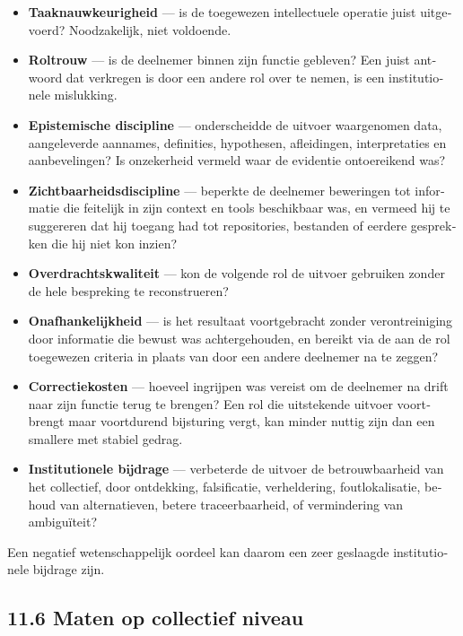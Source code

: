 \begin{dutch}
\begin{itemize}
  \item \textbf{Taaknauwkeurigheid} — is de toegewezen intellectuele operatie juist uitgevoerd? Noodzakelijk, niet voldoende.
  \item \textbf{Roltrouw} — is de deelnemer binnen zijn functie gebleven? Een juist antwoord dat verkregen is door een andere rol over te nemen, is een institutionele mislukking.
  \item \textbf{Epistemische discipline} — onderscheidde de uitvoer waargenomen data, aangeleverde aannames, definities, hypothesen, afleidingen, interpretaties en aanbevelingen? Is onzekerheid vermeld waar de evidentie ontoereikend was?
  \item \textbf{Zichtbaarheidsdiscipline} — beperkte de deelnemer beweringen tot informatie die feitelijk in zijn context en tools beschikbaar was, en vermeed hij te suggereren dat hij toegang had tot repositories, bestanden of eerdere gesprekken die hij niet kon inzien?
  \item \textbf{Overdrachtskwaliteit} — kon de volgende rol de uitvoer gebruiken zonder de hele bespreking te reconstrueren?
  \item \textbf{Onafhankelijkheid} — is het resultaat voortgebracht zonder verontreiniging door informatie die bewust was achtergehouden, en bereikt via de aan de rol toegewezen criteria in plaats van door een andere deelnemer na te zeggen?
  \item \textbf{Correctiekosten} — hoeveel ingrijpen was vereist om de deelnemer na drift naar zijn functie terug te brengen? Een rol die uitstekende uitvoer voortbrengt maar voortdurend bijsturing vergt, kan minder nuttig zijn dan een smallere met stabiel gedrag.
  \item \textbf{Institutionele bijdrage} — verbeterde de uitvoer de betrouwbaarheid van het collectief, door ontdekking, falsificatie, verheldering, foutlokalisatie, behoud van alternatieven, betere traceerbaarheid, of vermindering van ambiguïteit?
\end{itemize}
Een negatief wetenschappelijk oordeel kan daarom een zeer geslaagde institutionele bijdrage zijn.


\subsection*{11.6 Maten op collectief niveau}
\label{sec:nl:11.6}


\end{dutch}
